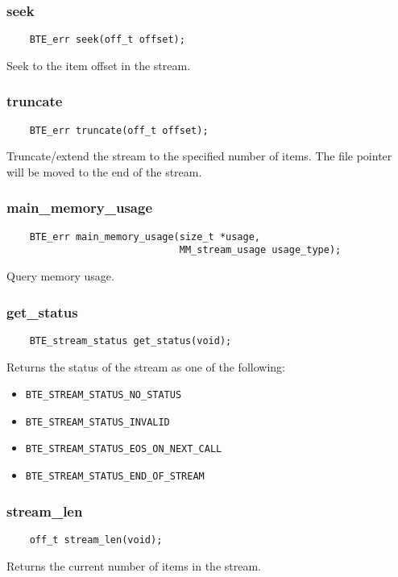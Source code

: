 \subsubsection{seek}
\begin{verbatim}
    BTE_err seek(off_t offset);
\end{verbatim}
Seek to the item offset in the stream.


\subsubsection{truncate}
\begin{verbatim}
    BTE_err truncate(off_t offset);
\end{verbatim}
Truncate/extend the stream to the specified number of items. The file
pointer will be moved to the end of the stream.


\subsubsection{main\_memory\_usage}
\begin{verbatim}
    BTE_err main_memory_usage(size_t *usage,
                              MM_stream_usage usage_type);
\end{verbatim}
Query memory usage.



\subsubsection{get\_status}
\begin{verbatim}
    BTE_stream_status get_status(void);
\end{verbatim}
Returns the status of the stream as one
of the following:
\begin{itemize}
\item \verb|BTE_STREAM_STATUS_NO_STATUS|
\item \verb|BTE_STREAM_STATUS_INVALID|
\item \verb|BTE_STREAM_STATUS_EOS_ON_NEXT_CALL|
\item \verb|BTE_STREAM_STATUS_END_OF_STREAM|
\end{itemize}


\subsubsection{stream\_len}
\begin{verbatim}
    off_t stream_len(void);
\end{verbatim}
Returns the current number of items in the stream.


